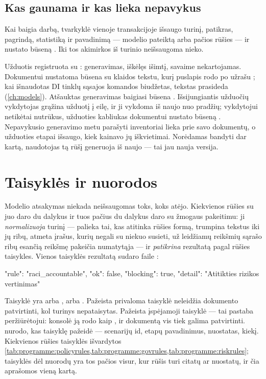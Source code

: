 \subsection{Kas gaunama ir kas lieka nepavykus}

Kai  baigia darbą, tvarkyklė vienoje transakcijoje išsaugo turinį, patikras,
pagrindą, statistiką ir pavadinimą --- modelio pateiktą arba pačios rūšies --- ir nustato
būseną . Iki tos akimirkos iš turinio neišsaugoma nieko.

Užduotis registruota su : generavimas, iškėlęs išimtį, savaime
nekartojamas. Dokumentui nustatoma būsena  su klaidos tekstu, kurį puslapis rodo
po užrašu ; kai išnaudotas DI tinklų sąsajos komandos biudžetas,
tekstas prasideda  (\cref{ch:models}). Atšauktas generavimas
baigiasi būsena . Išsijungiantis užduočių vykdytojas grąžina užduotį į eilę, ir
ji vykdoma iš naujo nuo pradžių; vykdytojui netikėtai nutrūkus, užduoties kabliukas
 dokumentui nustato būseną . Nepavykusio generavimo metu parašyti
inventoriai lieka prie savo dokumentų, o užduoties etapai išsaugo, kiek kainavo jų
iškvietimai. Norėdamas bandyti dar kartą, naudotojas tą rūšį generuoja iš naujo --- tai jau
nauja versija.


\section{Taisyklės ir nuorodos}\label{sec:programme:rules}

Modelio atsakymas niekada neišsaugomas toks, koks atėjo. Kiekvienos rūšies  su
juo daro du dalykus ir tuos pačius du dalykus daro su žmogaus pakeitimu: ji
\emph{normalizuoja} turinį --- palieka tai, kas atitinka rūšies formą, trumpina tekstus iki jų
ribų, atmeta įrašus, kurių negali su niekuo susieti, už leidžiamų reikšmių sąrašo ribų esančią
reikšmę pakeičia numatytąja --- ir \emph{patikrina} rezultatą pagal rūšies taisykles. Vienos
taisyklės rezultatą sudaro  faile :

\begin{codeblock}
{"rule": "raci_accountable", "ok": false, "blocking": true, "detail": "Atitikties rizikos vertinimas"}
\end{codeblock}

Taisyklė yra arba , arba . Pažeista privaloma taisyklė
neleidžia dokumento patvirtinti, kol turinys nepataisytas. Pažeista įspėjamoji taisyklė ---
tai pastaba peržiūrėtojui: konsolė ją rodo kaip , ir dokumentą vis tiek galima
patvirtinti.  nurodo, kas taisyklę pažeidė --- scenarijų id, etapų pavadinimus,
nuostatas, kiekį. Kiekvienos rūšies taisyklės išvardytos
\cref{tab:programme:policyrules,tab:programme:govrules,tab:programme:riskrules}; taisyklės dėl
nuorodų yra tos pačios visur, kur rūšis turi citatų ar nuostatų, ir čia aprašomos vieną kartą.

